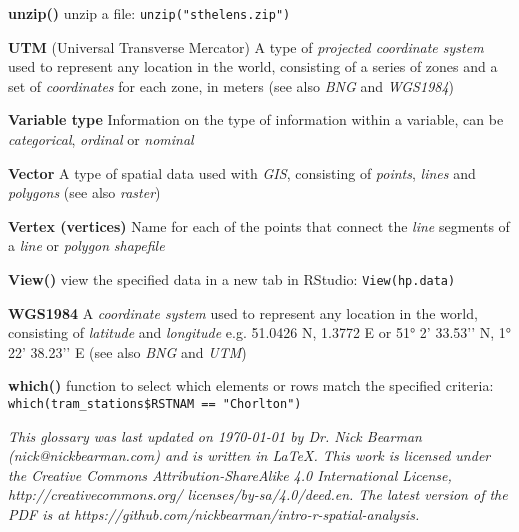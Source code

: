 \documentclass[a4paper,10pt]{article}
\begin{document}
\begin{multicols}{2}
\textbf{unzip()} unzip a file: \texttt{unzip("sthelens.zip")}

\textbf{UTM} (Universal Transverse Mercator) A type of \textit{projected coordinate system} used to represent any location in the world, consisting of a series of zones and a set of \textit{coordinates} for each zone, in meters (see also \textit{BNG} and \textit{WGS1984}) 

\textbf{Variable type} Information on the type of information within a variable, can be \textit{categorical}, \textit{ordinal} or \textit{nominal} 

\textbf{Vector} A type of spatial data used with \textit{GIS}, consisting of \textit{points}, \textit{lines} and \textit{polygons} (see also \textit{raster})

\textbf{Vertex (vertices)} Name for each of the points that connect the \textit{line} segments of a \textit{line} or \textit{polygon} \textit{shapefile}

\textbf{View()} view the specified data in a new tab in RStudio: \texttt{View(hp.data)}

\textbf{WGS1984} A \textit{coordinate system} used to represent any location in the world, consisting of \textit{latitude} and \textit{longitude} e.g. 51.0426 N, 1.3772 E or \ang{51} 2’ 33.53’’ N, \ang{1} 22’ 38.23’’ E (see also \textit{BNG} and \textit{UTM}) 

\textbf{which()} function to select which elements or rows match the specified criteria: \texttt{which(tram\_stations\$RSTNAM == "Chorlton")}

\end{multicols}

\begin{center}

{\footnotesize \textit{This glossary was last updated on {\today} by Dr. Nick Bearman (nick@nickbearman.com) and is written in LaTeX. This work is licensed under the Creative Commons Attribution-ShareAlike 4.0 International License, http://creativecommons.org/ licenses/by-sa/4.0/deed.en. The latest version of the PDF is at https://github.com/nickbearman/intro-r-spatial-analysis.}}

\end{center}
\end{document}
